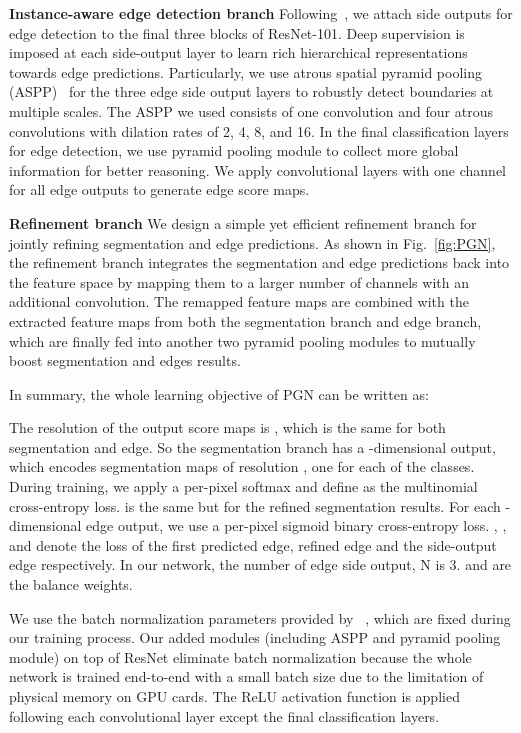 \documentclass[runningheads]{llncs}
\begin{document}
\textbf{Instance-aware edge detection branch}
Following~\cite{xie2015holistically}, we attach side outputs for edge detection to the final three blocks of ResNet-101. Deep supervision is imposed at each side-output layer to learn rich hierarchical representations towards edge predictions. Particularly, we use atrous spatial pyramid pooling (ASPP)~\cite{chen2016deeplab} for the three edge side output layers to robustly detect boundaries at multiple scales. The ASPP we used consists of one  convolution and four  atrous convolutions with dilation rates of 2, 4, 8, and 16. In the final classification layers for edge detection, we use pyramid pooling module to collect more global information for better reasoning. We apply  convolutional layers with one channel for all edge outputs to generate edge score maps.


\textbf{Refinement branch}
We design a simple yet efficient refinement branch for jointly refining segmentation and edge predictions. As shown in Fig.~\ref{fig:PGN}, the refinement branch integrates the segmentation and edge predictions back into the feature space by mapping them to a larger number of channels with an additional  convolution. The remapped feature maps are combined with the extracted feature maps from both the segmentation branch and edge branch, which are finally fed into another two pyramid pooling modules to mutually boost segmentation and edges results.

In summary, the whole learning objective of PGN can be written as:

The resolution of the output score maps is , which is the same for both segmentation and edge. So the segmentation branch has a -dimensional output, which encodes  segmentation maps of resolution , one for each of the  classes. During training, we apply a per-pixel softmax and define  as the multinomial cross-entropy loss.  is the same but for the refined segmentation results. For each -dimensional edge output, we use a per-pixel sigmoid binary cross-entropy loss. , , and  denote the loss of the first predicted edge, refined edge and the side-output edge respectively. In our network, the number of edge side output, N is 3.  and  are the balance weights.

We use the batch normalization parameters provided by ~\cite{chen2016deeplab}, which are fixed during our training process. Our added modules (including ASPP and pyramid pooling module) on top of ResNet eliminate batch normalization because the whole network is trained end-to-end with a small batch size due to the limitation of physical memory on GPU cards. The ReLU activation function is applied following each convolutional layer except the final classification layers.
\end{document}
